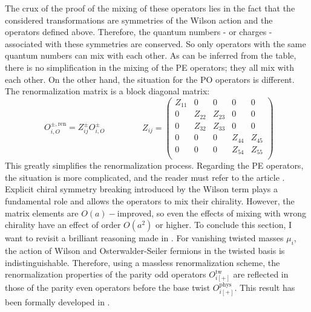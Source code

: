 \documentclass[english, LaM, oneside, noexaminfo]{sapthesis}
\newcommand{\ren}{{\text{ren}}}
\newcommand{\oaid}{$O(a)-$improved}
\begin{document}
\newline
The crux of the proof of the mixing of these operators lies in the fact that the considered transformations are symmetries of the Wilson action and the operators defined above.
Therefore, the quantum numbers - or charges - associated with these symmetries are conserved.
So only operators with the same quantum numbers can mix with each other.
As can be inferred from the table, there is no simplification in the mixing of the PE operators; they all mix with each other.
On the other hand, the situation for the PO operators is different.
The renormalization matrix is a block diagonal matrix:
\begin{equation*}
    \begin{split}
        O_{i,O}^{\pm,\ren} = Z_{ij}^\pm O_{i,O}^{\pm}
    \end{split}
    \qquad\qquad
    Z_{ij} = 
    \begin{pmatrix}
        Z_{11} & 0 & 0 & 0 & 0 \\
        0 & Z_{22} & Z_{23} & 0 & 0 \\
        0 & Z_{32} & Z_{33} & 0 & 0 \\
        0 & 0 & 0 & Z_{44} & Z_{45} \\
        0 & 0 & 0 & Z_{54} & Z_{55} \\
    \end{pmatrix}
\end{equation*}
This greatly simplifies the renormalization process.
Regarding the PE operators, the situation is more complicated, and the reader must refer to the article \cite{DoniniMartinelliOperators}.
Explicit chiral symmetry breaking introduced by the Wilson term plays a fundamental role and allows the operators to mix their chirality.
However, the matrix elements are \oaid, so even the effects of mixing with wrong chirality have an effect of order $O(a^2)$ or higher.
\newline
To conclude this section, I want to revisit a brilliant reasoning made in \cite{KMBSM}.
For vanishing twisted masses $\mu_i$, the action of Wilson and Osterwalder-Seiler fermions in the twisted basis is indistinguishable.
Therefore, using a massless renormalization scheme, the renormalization properties of the parity odd operators $O_{i[+]}^\text{tw}$ are reflected in those of the parity even operators before the base twist $O_{i[+]}^\text{phys}$.
This result has been formally developed in \cite{FR2}.
\end{document}
